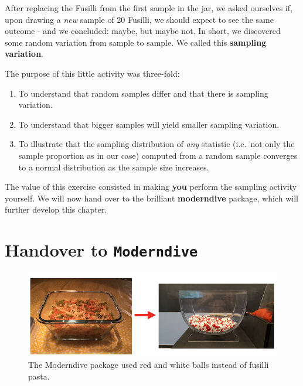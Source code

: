\documentclass[]{book}
\providecommand{\tightlist}{%
  \setlength{\itemsep}{0pt}\setlength{\parskip}{0pt}}
\newenvironment{note}{\begin{tcolorbox}[colback=blue!5!white,colframe=blue!75!black]}{\end{tcolorbox}}
\begin{document}
After replacing the Fusilli from the first sample in the jar, we asked ourselves if, upon drawing a \emph{new} sample of 20 Fusilli, we should expect to see the same outcome - and we concluded: maybe, but maybe not. In short, we discovered some random variation from sample to sample. We called this \textbf{sampling variation}.

The purpose of this little activity was three-fold:

\begin{enumerate}
\def\labelenumi{\arabic{enumi}.}
\tightlist
\item
  To understand that random samples differ and that there is sampling variation.
\item
  To understand that bigger samples will yield smaller sampling variation.
\item
  To illustrate that the sampling distribution of \emph{any} statistic (i.e.~not only the sample proportion as in our case) computed from a random sample converges to a normal distribution as the sample size increases.
\end{enumerate}

\begin{note}
The value of this exercise consisted in making \textbf{you} perform the
sampling activity yourself. We will now hand over to the brilliant
\textbf{moderndive} package, which will further develop this chapter.
\end{note}

\hypertarget{handover-to-moderndive}{%
\section{\texorpdfstring{Handover to \texttt{Moderndive}}{Handover to Moderndive}}\label{handover-to-moderndive}}

\begin{figure}

{\centering \includegraphics[width=0.9\linewidth]{images/transition} 

}

\caption{The Moderndive package used red and white balls instead of fusilli pasta.}\label{fig:handover}
\end{figure}
\end{document}
